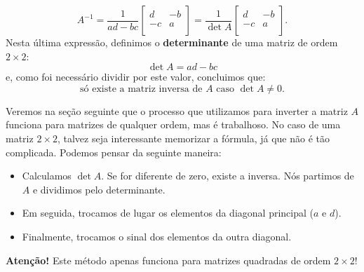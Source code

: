 \begin{equation}
\boxed{A^{-1} = \frac{1}{ad - bc} \left[
	\begin{array}{cc}
	d  & -b  \\
	-c & a \\
	\end{array}
	\right] =
	\frac{1}{\det A} \left[
	\begin{array}{cc}
	d  & -b  \\
	-c & a \\
	\end{array}
	\right].}
\end{equation} Nesta última expressão, definimos o \textbf{determinante} de uma matriz de ordem $2\times 2$:
\begin{equation}
\det A = ad - bc
\end{equation} e, como foi necessário dividir por este valor, concluimos que:
\begin{equation}
\boxed{\text{só existe a matriz inversa de $A$ caso $\det A \neq 0$.}}
\end{equation}


\begin{obs}
	Veremos na seção seguinte que o processo que utilizamos para inverter a matriz $A$ funciona para matrizes de qualquer ordem, mas é trabalhoso. No caso de uma matriz $2\times 2$, talvez seja interessante memorizar a fórmula, já que não é tão complicada. Podemos pensar da seguinte maneira:
	\begin{itemize}
		\item Calculamos $\det A$. Se for diferente de zero, existe a inversa. Nós partimos de $A$ e dividimos pelo determinante.
		\item Em seguida, trocamos de lugar os elementos da diagonal principal ($a$ e $d$).
		\item Finalmente, trocamos o sinal dos elementos da outra diagonal.
	\end{itemize}
	\textbf{Atenção!} Este método apenas funciona para matrizes quadradas de ordem $2\times 2$!
\end{obs}

